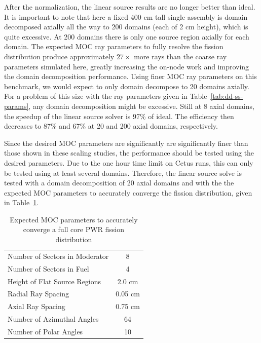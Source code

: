 After the normalization, the linear source results are no longer better than ideal. It is important to note that here a fixed 400 cm tall single assembly is domain decomposed axially all the way to 200 domains (each of 2 cm height), which is quite excessive. At 200 domains there is only one source region axially for each domain. The expected \ac{MOC} ray parameters to fully resolve the fission distribution produce approximately $27\times$ more rays than the coarse ray parameters simulated here, greatly increasing the on-node work and improving the domain decomposition performance. Using finer \ac{MOC} ray parameters on this benchmark, we would expect to only domain decompose to 20 domains axially. For a problem of this size with the ray parameters given in Table~\ref{tab:dd-ss-params}, any domain decomposition might be excessive. Still at 8 axial domains, the speedup of the linear source solver is 97\% of ideal. The efficiency then decreases to 87\% and 67\% at 20 and 200 axial domains, respectively.

Since the desired \ac{MOC} parameters are significantly are significantly finer than those shown in these scaling studies, the performance should be tested using the desired parameters. Due to the one hour time limit on Cetus runs, this can only be tested using at least several domains. Therefore, the linear source solve is tested with a domain decomposition of 20 axial domains and with the the expected \ac{MOC} parameters to accurately converge the fission distribution, given in Table~\ref{tab:expected-moc-params}.

\begin{table}[ht]
	\centering
	\caption{Expected MOC parameters to accurately converge a full core PWR fission distribution}
	\medskip
	\begin{tabular}{lc}
		\hline
		Number of Sectors in Moderator & 8 \\
		Number of Sectors in Fuel & 4 \\
		Height of Flat Source Regions & 2.0 cm \\
		Radial Ray Spacing & 0.05 cm \\
		Axial Ray Spacing & 0.75 cm \\
		Number of Azimuthal Angles & 64 \\
		Number of Polar Angles & 10 \\
		\hline
	\end{tabular}
	\label{tab:expected-moc-params}
\end{table}

